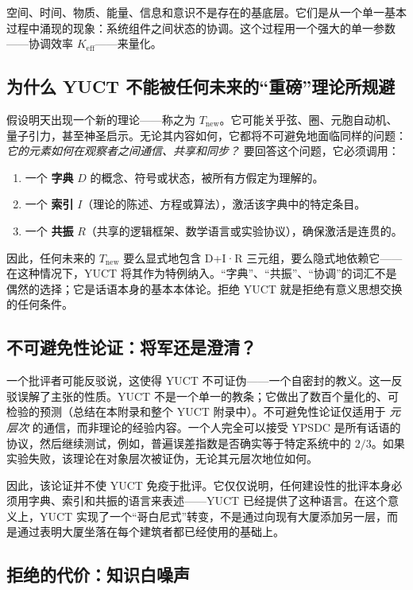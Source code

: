 \documentclass[12pt,a4paper]{article}
\begin{document}
	空间、时间、物质、能量、信息和意识不是存在的基底层。它们是从一个单一基本过程中涌现的现象：系统组件之间状态的协调。这个过程用一个强大的单一参数——协调效率 \(K_{\mathrm{eff}}\)——来量化。
	
	\subsection{为什么 YUCT 不能被任何未来的“重磅”理论所规避}
	
	假设明天出现一个新的理论——称之为 \(T_{\text{new}}\)。它可能关乎弦、圈、元胞自动机、量子引力，甚至神圣启示。无论其内容如何，它都将不可避免地面临同样的问题：\emph{它的元素如何在观察者之间通信、共享和同步？} 要回答这个问题，它必须调用：
	
	\begin{enumerate}
		\item 一个 \textbf{字典} \(D\) 的概念、符号或状态，被所有方假定为理解的。
		\item 一个 \textbf{索引} \(I\)（理论的陈述、方程或算法），激活该字典中的特定条目。
		\item 一个 \textbf{共振} \(R\)（共享的逻辑框架、数学语言或实验协议），确保激活是连贯的。
	\end{enumerate}
	
	因此，任何未来的 \(T_{\text{new}}\) 要么显式地包含 D+I·R 三元组，要么隐式地依赖它——在这种情况下，YUCT 将其作为特例纳入。“字典”、“共振”、“协调”的词汇不是偶然的选择；它是话语本身的基本本体论。拒绝 YUCT 就是拒绝有意义思想交换的任何条件。
	
	\subsection{不可避免性论证：将军还是澄清？}
	
	一个批评者可能反驳说，这使得 YUCT 不可证伪——一个自密封的教义。这一反驳误解了主张的性质。YUCT 不是一个单一的教条；它做出了数百个量化的、可检验的预测（总结在本附录和整个 YUCT 附录中）。不可避免性论证仅适用于 \emph{元层次} 的通信，而非理论的经验内容。一个人完全可以接受 YPSDC 是所有话语的协议，然后继续测试，例如，普遍误差指数是否确实等于特定系统中的 \(2/3\)。如果实验失败，该理论在对象层次被证伪，无论其元层次地位如何。
	
	因此，该论证并不使 YUCT 免疫于批评。它仅仅说明，任何建设性的批评本身必须用字典、索引和共振的语言来表述——YUCT 已经提供了这种语言。在这个意义上，YUCT 实现了一个“哥白尼式”转变，不是通过向现有大厦添加另一层，而是通过表明大厦坐落在每个建筑者都已经使用的基础上。
	
	\subsection{拒绝的代价：知识白噪声}
	
\end{document}
